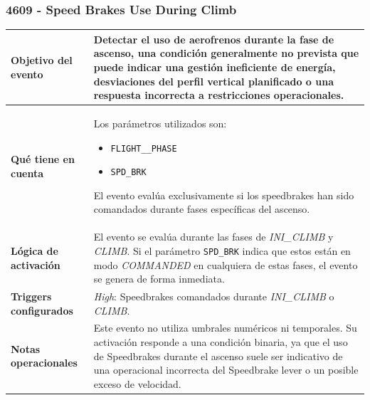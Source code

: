 \documentclass[11pt,a4paper]{article}
\begin{document}
	\subsubsection{4609 - Speed Brakes Use During Climb}
	\begin{table}[H]
		\centering
		\renewcommand{\arraystretch}{1.3}
		\begin{tabular}{p{5cm} p{9.5cm}}
			\hline
			\textbf{Objetivo del evento} &
			Detectar el uso de aerofrenos durante la fase de ascenso, una condición generalmente no prevista que puede indicar una gestión ineficiente de energía, desviaciones del perfil vertical planificado o una respuesta incorrecta a restricciones operacionales. \\
			\hline
			\textbf{Qué tiene en cuenta} &
			Los parámetros utilizados son:
			\begin{itemize}
				\item \texttt{FLIGHT\_\_PHASE}
				\item \texttt{SPD\_BRK}
			\end{itemize}
			El evento evalúa exclusivamente si los speedbrakes han sido comandados durante fases específicas del ascenso. \\
			\hline
			\textbf{Lógica de activación} &
			El evento se evalúa durante las fases de \textit{INI\_CLIMB} y \textit{CLIMB}. 
			Si el parámetro \texttt{SPD\_BRK} indica que estos están en modo \textit{COMMANDED} en cualquiera de estas fases, el evento se genera de forma inmediata. \\
			\hline
			\textbf{Triggers configurados} &
			\textit{High}: Speedbrakes comandados durante \textit{INI\_CLIMB} o \textit{CLIMB}. \\
			\hline
			\textbf{Notas operacionales} &
			Este evento no utiliza umbrales numéricos ni temporales. Su activación responde a una condición binaria, ya que el uso de Speedbrakes durante el ascenso suele ser indicativo de una operacional incorrecta del Speedbrake lever o un posible exceso de velocidad. \\
			\hline
		\end{tabular}
	\end{table}
\end{document}
